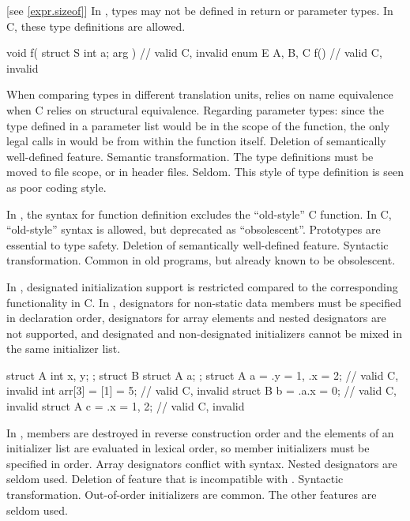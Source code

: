  [see \ref{expr.sizeof}]
\change
In \Cpp{}, types may not be defined in return or parameter types.
In C, these type definitions are allowed.

\begin{example}
\begin{codeblock}
void f( struct S { int a; } arg ) {}    // valid C, invalid \Cpp{}
enum E { A, B, C } f() {}               // valid C, invalid \Cpp{}
\end{codeblock}
\end{example}

\rationale
When comparing types in different translation units, \Cpp{} relies
on name equivalence when C relies on structural equivalence.
Regarding parameter types: since the type defined in a parameter list
would be in the scope of the function, the only legal calls in \Cpp{}
would be from within the function itself.
\effect
Deletion of semantically well-defined feature.
\difficulty
Semantic transformation.
The type definitions must be moved to file scope, or in header files.
\howwide
Seldom.
This style of type definition is seen as poor coding style.

\change
In \Cpp{}, the syntax for function definition excludes the ``old-style'' C function.
In C, ``old-style'' syntax is allowed, but deprecated as ``obsolescent''.
\rationale
Prototypes are essential to type safety.
\effect
Deletion of semantically well-defined feature.
\difficulty
Syntactic transformation.
\howwide
Common in old programs, but already known to be obsolescent.

\change
In \Cpp{}, designated initialization support is restricted
compared to the corresponding functionality in C\@.
In \Cpp{},
designators for non-static data members
must be specified in declaration order,
designators for array elements and nested designators
are not supported,
and
designated and non-designated initializers
cannot be mixed in the same initializer list.

\begin{example}
\begin{codeblock}
struct A { int x, y; };
struct B { struct A a; };
struct A a = {.y = 1, .x = 2};  // valid C, invalid \Cpp{}
int arr[3] = {[1] = 5};         // valid C, invalid \Cpp{}
struct B b = {.a.x = 0};        // valid C, invalid \Cpp{}
struct A c = {.x = 1, 2};       // valid C, invalid \Cpp{}
\end{codeblock}
\end{example}
\rationale
In \Cpp{}, members are destroyed in reverse construction order
and the elements of an initializer list are evaluated in lexical order,
so member initializers must be specified in order.
Array designators conflict with  syntax.
Nested designators are seldom used.
\effect
Deletion of feature that is incompatible with \Cpp{}.
\difficulty
Syntactic transformation.
\howwide
Out-of-order initializers are common.
The other features are seldom used.

